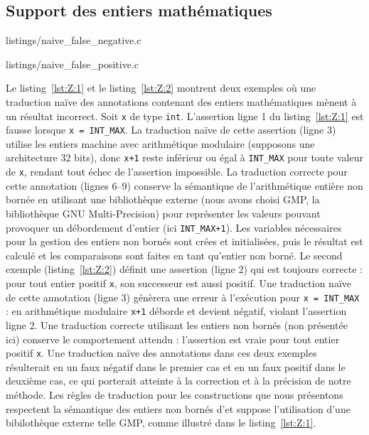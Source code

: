 \subsection{Support des entiers mathématiques}\label{sec:integers}



                {listings/naive_false_negative.c}


                {listings/naive_false_positive.c}


Le listing~\ref{lst:Z:1} et le listing~\ref{lst:Z:2} montrent deux exemples où
une traduction naïve des annotations contenant des entiers mathématiques mènent
à un résultat incorrect.
Soit \lstinline'x' de type \lstinline'int'.
L'assertion ligne 1 du listing~\ref{lst:Z:1} est fausse lorsque
\lstinline'x = INT_MAX'.
La traduction naïve de cette assertion (ligne 3) utilise les entiers machine
avec arithmétique modulaire (supposons une architecture 32 bits), donc
\lstinline'x+1' reste inférieur ou égal à \lstinline'INT_MAX' pour toute valeur
de \lstinline'x', rendant tout échec de l'assertion impossible.
La traduction correcte pour cette annotation (lignes 6--9) conserve la
sémantique de l'arithmétique entière non bornée en utilisant une bibliothèque
externe (nous avons choisi GMP, la bibliothèque GNU Multi-Precision) pour
représenter les valeurs pouvant provoquer un débordement d'entier (ici
\lstinline'INT_MAX+1').
Les variables nécessaires pour la gestion des entiers non bornés sont crées et
initialisées, puis le résultat est calculé et les comparaisons sont faites en
tant qu'entier non borné.
Le second exemple (listing~\ref{lst:Z:2}) définit une assertion \eacsl (ligne 2)
qui est toujours correcte : pour tout entier positif \lstinline'x', son
successeur est aussi positif.
Une traduction naïve de cette annotation (ligne 3) génèrera une erreur à
l'exécution pour \lstinline'x = INT_MAX' : en arithmétique modulaire
\lstinline'x+1' déborde et devient négatif, violant l'assertion ligne 2.
Une traduction correcte utilisant les entiers non bornés (non présentée ici)
conserve le comportement attendu : l'assertion est vraie pour tout entier
positif \lstinline'x'.
Une traduction naïve des annotations dans ces deux exemples résulterait en un
faux négatif dans le premier cas et en un faux positif dans le deuxième cas, ce
qui porterait atteinte à la correction et à la précision de notre méthode.
Les règles de traduction pour les constructions \eacsl que nous présentons
respectent la sémantique des entiers non bornés d'\eacsl et suppose
l'utilisation d'une bibilothèque externe telle GMP, comme illustré dans le
listing~\ref{lst:Z:1}.

